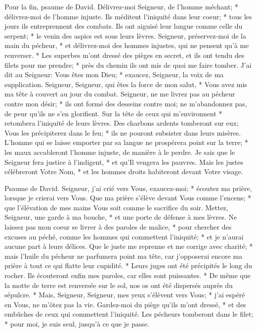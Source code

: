Pour la fin, psaume de David.
Délivrez-moi Seigneur, de l'homme méchant; * délivrez-moi de l'homme injuste.
Ils méditent l'iniquité dans leur coeur; * tous les jours ils entreprennent des combats.
Ils ont aiguisé leur langue comme celle du serpent; * le venin des aspics est sous leurs lèvres.
Seigneur, préservez-moi de la main du pécheur, * et délivrez-moi des hommes injustes, qui ne pensent qu'à me renverser. *
Les superbes m'ont dressé des pièges en secret, et ils ont tendu des filets pour me prendre; * près du chemin ils ont mis de quoi me faire tomber.
J'ai dit au Seigneur: Vous êtes mon Dieu; * exaucez, Seigneur, la voix de ma supplication.
Seigneur, Seigneur, qui êtes la force de mon salut, * Vous avez mis ma tête à couvert au jour du combat.
Seigneur, ne me livrez pas au pécheur contre mon désir; * ils ont formé des desseins contre moi; ne m'abandonnez pas, de peur qu'ils ne s'en glorifient.
Sur la tête de ceux qui m'environnent * retombera l'iniquité de leurs lèvres.
Des charbons ardents tomberont sur eux; Vous les précipiterez dans le feu; * ils ne pouront subsister dans leurs misères.
L'homme qui se laisse emporter par sa langue ne prospérera point sur la terre; * les maux accableront l'homme injuste, de manière à le perdre.
Je sais que le Seigneur fera justice à l'indigent, * et qu'Il vengera les pauvres.
Mais les justes célébreront Votre Nom, * et les hommes droits habiteront devant Votre visage.

Psaume de David. Seigneur, j'ai crié vers Vous, exaucez-moi; * écoutez ma prière, lorsque je crierai vers Vous.
Que ma prière s'élève devant Vous comme l'encens; * que l'élévation de mes mains Vous soit comme le sacrifice du soir.
Mettez, Seigneur, une garde à ma bouche, * et une porte de défense à mes lèvres.
Ne laissez pas mon coeur se livrer à des paroles de malice, * pour chercher des excuses au péché, comme les hommes qui commettent l'iniquité; * et je n'aurai aucune part à leurs délices.
Que le juste me reprenne et me corrige avec charité; * mais l'huile du pécheur ne parfumera point ma tête, car j'opposerai encore ma prière à tout ce qui flatte leur cupidité. *
Leurs juges ont été précipités le long du rocher. Ils écouteront enfin mes paroles, car elles sont puissantes. *
De même que la motte de terre est renversée sur le sol, nos os ont été dispersés auprès du sépulcre. *
Mais, Seigneur, Seigneur, mes yeux s'élèvent vers Vous; * j'ai espéré en Vous, ne m'ôtez pas la vie.
Gardez-moi du piège qu'ils m'ont dressé, * et des embûches de ceux qui commettent l'iniquité.
Les pécheurs tomberont dans le filet; * pour moi, je suis seul, jusqu'à ce que je passe.


